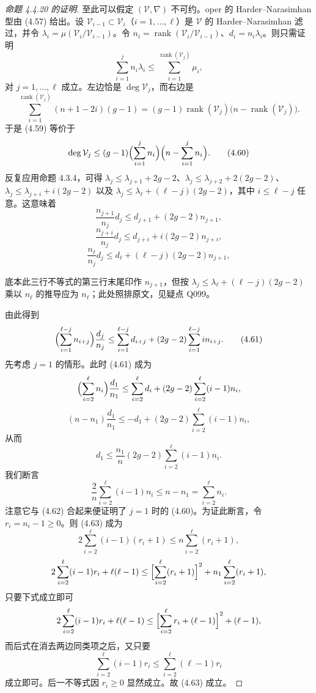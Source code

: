 \begin{proof}[命题 4.4.20 的证明]
至此可以假定 $(\mathcal{V},\nabla)$ 不可约。oper 的 Harder--Narasimhan 型由 (4.57) 给出。设 $\mathcal{V}_{i-1}\subset\mathcal{V}_i$（$i=1,\dots,\ell$）是 $\mathcal{V}$ 的 Harder--Narasimhan 滤过，并令 $\lambda_i=\mu(\mathcal{V}_i/\mathcal{V}_{i-1})$。令 $n_i=\operatorname{rank}(\mathcal{V}_i/\mathcal{V}_{i-1})$、$d_i=n_i\lambda_i$。则只需证明
\begin{equation}
\sum_{i=1}^j n_i\lambda_i\le\sum_{i=1}^{\operatorname{rank}(\mathcal{V}_j)}\mu_i,
\tag{4.59}
\end{equation}
对 $j=1,\dots,\ell$ 成立。左边恰是 $\deg\mathcal{V}_j$，而右边是
\[
\sum_{i=1}^{\operatorname{rank}(\mathcal{V}_j)}(n+1-2i)(g-1)=(g-1)\operatorname{rank}(\mathcal{V}_j)\bigl(n-\operatorname{rank}(\mathcal{V}_j)\bigr).
\]
于是 (4.59) 等价于
\begin{equation}
\deg\mathcal{V}_j\le(g-1)\Bigl(\sum_{i=1}^j n_i\Bigr)\Bigl(n-\sum_{i=1}^j n_i\Bigr).
\tag{4.60}
\end{equation}
反复应用命题 4.3.4，可得 $\lambda_j\le\lambda_{j+1}+2g-2$、$\lambda_j\le\lambda_{j+2}+2(2g-2)$、$\lambda_j\le\lambda_{j+i}+i(2g-2)$ 以及 $\lambda_j\le\lambda_\ell+(\ell-j)(2g-2)$，其中 $i\le\ell-j$ 任意。这意味着
\[
\frac{n_{j+1}}{n_j}d_j\le d_{j+1}+(2g-2)n_{j+1},
\]
\[
\frac{n_{j+i}}{n_j}d_j\le d_{j+i}+i(2g-2)n_{j+i},
\]
\[
\frac{n_\ell}{n_j}d_j\le d_\ell+(\ell-j)(2g-2)n_{j+1},
\]
\begin{annote}
底本此三行不等式的第三行末尾印作 $n_{j+1}$，但按 $\lambda_j\le\lambda_\ell+(\ell-j)(2g-2)$ 乘以 $n_\ell$ 的推导应为 $n_\ell$；此处照排原文，见疑点 Q099。
\end{annote}
由此得到
\begin{equation}
\Bigl(\sum_{i=1}^{\ell-j}n_{i+j}\Bigr)\frac{d_j}{n_j}\le\sum_{i=1}^{\ell-j}d_{i+j}+(2g-2)\sum_{i=1}^{\ell-j}in_{i+j}.
\tag{4.61}
\end{equation}
先考虑 $j=1$ 的情形。此时 (4.61) 成为
\[
\Bigl(\sum_{i=2}^{\ell}n_i\Bigr)\frac{d_1}{n_1}\le\sum_{i=2}^{\ell}d_i+(2g-2)\sum_{i=2}^{\ell}(i-1)n_i,
\]
\[
(n-n_1)\frac{d_1}{n_1}\le-d_1+(2g-2)\sum_{i=2}^{\ell}(i-1)n_i,
\]
从而
\begin{equation}
d_1\le\frac{n_1}{n}(2g-2)\sum_{i=2}^{\ell}(i-1)n_i.
\tag{4.62}
\end{equation}
我们断言
\begin{equation}
\frac{2}{n}\sum_{i=2}^{\ell}(i-1)n_i\le n-n_1=\sum_{i=2}^{\ell}n_i.
\tag{4.63}
\end{equation}
注意它与 (4.62) 合起来便证明了 $j=1$ 时的 (4.60)。为证此断言，令 $r_i=n_i-1\ge0$。则 (4.63) 成为
\[
2\sum_{i=2}^{\ell}(i-1)(r_i+1)\le n\sum_{i=2}^{\ell}(r_i+1),
\]
\[
2\sum_{i=2}^{\ell}(i-1)r_i+\ell(\ell-1)\le\Bigl[\sum_{i=2}^{\ell}(r_i+1)\Bigr]^2+n_1\sum_{i=2}^{\ell}(r_i+1),
\]
只要下式成立即可
\[
2\sum_{i=2}^{\ell}(i-1)r_i+\ell(\ell-1)\le\Bigl[\sum_{i=2}^{\ell}r_i+(\ell-1)\Bigr]^2+(\ell-1),
\]
而后式在消去两边同类项之后，又只要
\[
\sum_{i=2}^{\ell}(i-1)r_i\le\sum_{i=2}^{\ell}(\ell-1)r_i
\]
成立即可。后一不等式因 $r_i\ge0$ 显然成立。故 (4.63) 成立。


\end{proof}

